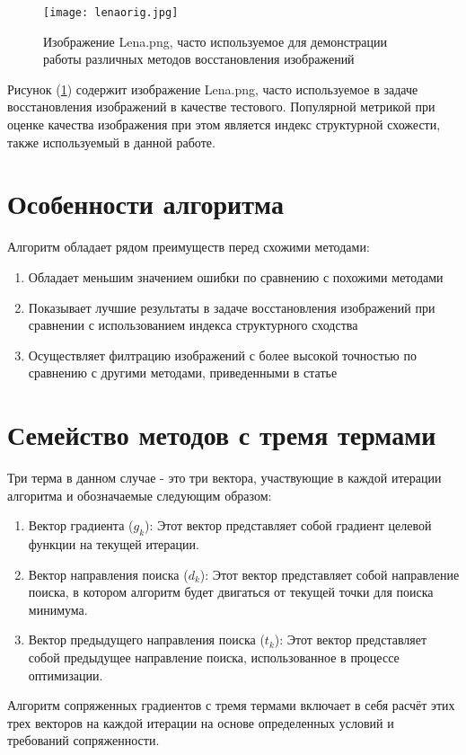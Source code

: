 \begin{figure}[ht]
    \centering
    \texttt{[image: lenaorig.jpg]}
    \caption{Изображение Lena.png, часто используемое для демонстрации работы
    различных методов восстановления изображений}
    \label{fig:lena}
\end{figure}

Рисунок (\ref{fig:lena}) содержит изображение Lena.png, часто используемое в
задаче восстановления изображений в качестве тестового. Популярной метрикой при
оценке качества изображения при этом является индекс структурной схожести, также
используемый в данной работе.

\section{Особенности алгоритма}

Алгоритм обладает рядом преимуществ перед схожими методами:

\begin{enumerate}
    \item Обладает меньшим значением ошибки по сравнению с похожими методами
    \item Показывает лучшие результаты в задаче восстановления изображений при
    сравнении с использованием индекса структурного сходства
    \item Осуществляет филтрацию изображений с более высокой точностью по
    сравнению с другими методами, приведенными в статье
\end{enumerate}

\section{Семейство методов с тремя термами}
Три терма в данном случае - это три вектора, участвующие в каждой итерации
алгоритма и обозначаемые следующим образом:
\begin{enumerate}
    \item Вектор градиента ($g_{k}$): Этот вектор представляет собой градиент
    целевой функции на текущей итерации.
    \item Вектор направления поиска ($d_{k}$): Этот вектор представляет собой
    направление поиска, в котором алгоритм будет двигаться от текущей точки для
    поиска минимума.
    \item Вектор предыдущего направления поиска ($t_{k}$): Этот вектор
    представляет собой предыдущее направление поиска, использованное в процессе
    оптимизации.
\end{enumerate}
Алгоритм сопряженных градиентов с тремя термами включает в себя расчёт этих трех
векторов на каждой итерации на основе определенных условий и требований
сопряженности.

